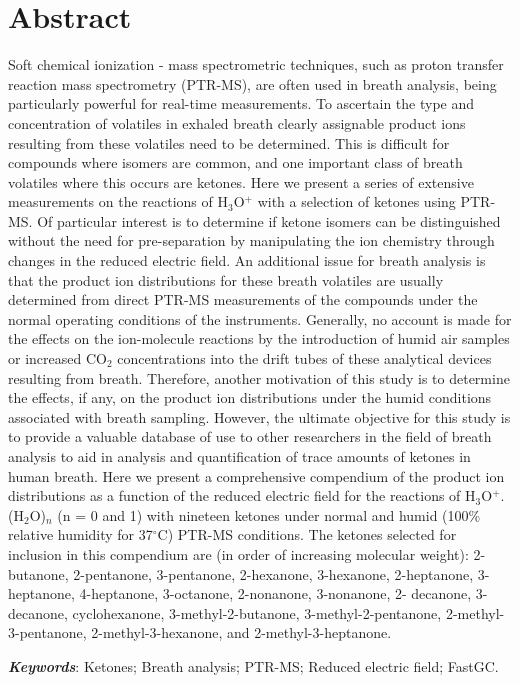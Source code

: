 \section{Abstract}
Soft chemical ionization - mass spectrometric techniques, such as proton transfer reaction mass spectrometry (PTR-MS), are often used in breath analysis, being particularly powerful for real-time measurements. To ascertain the type and concentration of volatiles in exhaled breath clearly assignable product ions resulting from these volatiles need to be determined. This is difficult for compounds where isomers are common, and one important class of breath volatiles where this occurs are ketones. Here we present a series of extensive measurements on the reactions of H$_{3}$O$^+$ with a selection of ketones using PTR-MS. Of particular interest is to determine if ketone isomers can be distinguished without the need for pre-separation by manipulating the ion chemistry through changes in the reduced electric field. An additional issue for breath analysis is that the product ion distributions for these breath volatiles are usually determined from direct PTR-MS measurements of the compounds under the normal operating conditions of the instruments. Generally, no account is made for the effects on the ion-molecule reactions by the introduction of humid air samples or increased CO$_2$ concentrations into the drift tubes of these analytical devices resulting from breath. Therefore, another motivation of this study is to determine the effects, if any, on the product ion distributions under the humid conditions associated with breath sampling. However, the ultimate objective for this study is to provide a valuable database of use to other researchers in the field of breath analysis to aid in analysis and quantification of trace amounts of ketones in human breath. Here we present a comprehensive compendium of the product ion distributions as a function of the reduced electric field for the reactions of H$_{3}$O$^+$. (H$_{2}$O)$_n$ (n = 0 and 1) with nineteen ketones under normal and humid (100\% relative humidity for 37$^{\circ}$C) PTR-MS conditions. The ketones selected for inclusion in this compendium are (in order of increasing molecular weight): 2-butanone, 2-pentanone, 3-pentanone, 2-hexanone, 3-hexanone, 2-heptanone, 3-heptanone, 4-heptanone, 3-octanone, 2-nonanone, 3-nonanone, 2- decanone, 3-decanone, cyclohexanone, 3-methyl-2-butanone, 3-methyl-2-pentanone, 2-methyl-3-pentanone, 2-methyl-3-hexanone, and 2-methyl-3-heptanone.

\textbf{\textit{Keywords}}: Ketones; Breath analysis; PTR-MS; Reduced electric field; FastGC.


